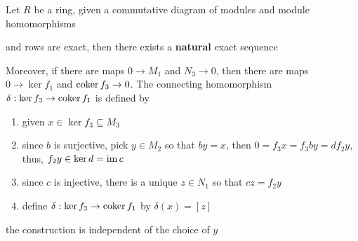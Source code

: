 \begin{lemma}
	Let $R$ be a ring, given a commutative diagram of modules and module homomorphisms
	\begin{center}
	\end{center}
	
	and rows are exact, then there exists a \textbf{natural} exact sequence 
	\begin{center}
	\end{center}
	
	Moreover, if there are maps $0 \to M_1$ and $N_3 \to 0$, then there are maps $0 \to \ker f_1$ and $\operatorname{coker} f_3 \to 0$. The connecting homomorphism $\delta: \ker f_3 \to \operatorname{coker} f_1$ is defined by
	\begin{enumerate}
		\item given $x \in \ker f_3 \subseteq M_3$
		\item since $b$ is surjective, pick $y \in M_2$ so that $b y = x$, then $0 = f_3 x = f_3 b y = d f_2 y$, thus, $f_2 y \in \ker d = \operatorname{im} c$
		\item since $c$ is injective, there is a unique $z \in N_1$ so that $c z = f_2 y$
		\item define $\delta: \ker f_3 \to \operatorname{coker} f_1$ by $\delta(x) = [z]$
	\end{enumerate}
	
	the construction is independent of the choice of $y$
\end{lemma}

